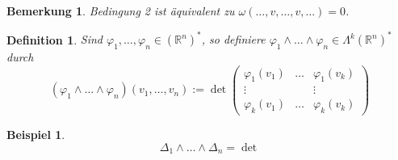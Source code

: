 \documentclass[10pt,a4paper]{report}
\newtheorem*{defi}{Definition}
\newtheorem*{remark}{Bemerkung}
\newtheorem*{example}{Beispiel}
\begin{document}
\begin{remark}
  Bedingung 2 ist äquivalent zu $\omega(\dots, v, \dots, v, \dots) = 0$.
\end{remark}

\begin{defi}
  Sind $\varphi_{1}, \dots, \varphi_{n} \in (\mathbb{R}^{n})^{*}$, so definiere $\varphi_{1} \wedge \dots \wedge \varphi_{n} \in \Lambda^{k}(\mathbb{R}^{n})^{*}$ durch
  \begin{equation}
    (\varphi_{1} \wedge \dots \wedge \varphi_{n})(v_{1}, \dots, v_{n}) := \det \begin{pmatrix}
      \varphi_{1}(v_{1}) & \dots & \varphi_{1}(v_{k})\\
      \vdots & & \vdots\\
      \varphi_{k}(v_{1}) & \dots & \varphi_{k}(v_{k})
    \end{pmatrix}
  \end{equation}
\end{defi}

\begin{example}
  \begin{equation}
    \Delta_{1} \wedge \dots \wedge \Delta_{n} = \det
  \end{equation}
\end{example}
\end{document}
